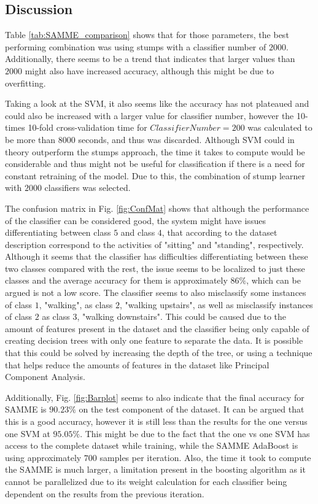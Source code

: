 \documentclass{article}
\begin{document}
\subsection{Discussion}
Table \ref{tab:SAMME_comparison} shows that for those parameters, the best performing combination was using stumps with a classifier number of $2000$. Additionally, there seems to be a trend that indicates that larger values than $2000$ might also have increased accuracy, although this might be due to overfitting. 

Taking a look at the SVM, it also seems like the accuracy has not plateaued and could also be increased with a larger value for classifier number, however the 10-times 10-fold cross-validation time for $ClassifierNumber=200$ was calculated to be more than $8000$ seconds, and thus was discarded. Although SVM could in theory outperform the stumps approach, the time it takes to compute would be considerable and thus might not be useful for classification if there is a need for constant retraining of the model. Due to this, the combination of stump learner with $2000$ classifiers was selected.

The confusion matrix in Fig. \ref{fig:ConfMat} shows that although the performance of the classifier can be considered good, the system might have issues differentiating between class $5$ and class $4$, that according to the dataset description correspond to the activities of "sitting" and "standing", respectively. Although it seems that the classifier has difficulties differentiating between these two classes compared with the rest, the issue seems to be localized to just these classes and the average accuracy for them is approximately $86\%$, which can be argued is not a low score. The classifier seems to also misclassify some instances of class $1$, "walking", as class $2$, "walking upstairs", as well as misclassify instances of class $2$ as class $3$, "walking downstairs". This could be caused due to the amount of features present in the dataset and the classifier being only capable of creating decision trees with only one feature to separate the data. It is possible that this could be solved by increasing the depth of the tree, or using a technique that helps reduce the amounts of features in the dataset like Principal Component Analysis.

Additionally, Fig. \ref{fig:Barplot} seems to also indicate that the final accuracy for SAMME is $90.23\%$ on the test component of the dataset. It can be argued that this is a good accuracy, however it is still less than the results for the one versus one SVM at $95.05\%$. This might be due to the fact that the one vs one SVM has access to the complete dataset while training, while the SAMME AdaBoost is using approximately $700$ samples per iteration. Also, the time it took to compute the SAMME is much larger, a limitation present in the boosting algorithm as it cannot be parallelized due to its weight calculation for each classifier being dependent on the results from the previous iteration. 
\end{document}
